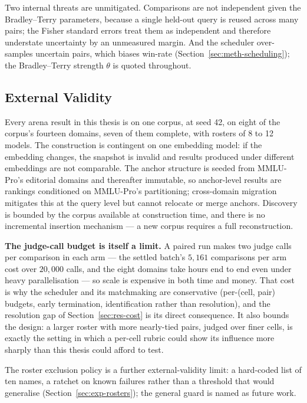 Two internal threats are unmitigated. Comparisons are not independent
given the Bradley--Terry parameters, because a single held-out query is
reused across many pairs; the Fisher standard errors treat them as
independent and therefore understate uncertainty by an unmeasured
margin. And the scheduler over-samples uncertain pairs, which biases
win-rate (Section~\ref{sec:meth-scheduling}); the Bradley--Terry
strength $\theta$ is quoted throughout.

\subsection{External Validity}\label{subsec:disc-external-validity}

Every arena result in this thesis is on one corpus, at seed 42, on
eight of the corpus's fourteen domains, seven of them complete, with
rosters of 8 to 12 models. The construction is
contingent on one embedding model: if the embedding changes, the
snapshot is invalid and results produced under different embeddings are
not comparable. The anchor structure is seeded from MMLU-Pro's
editorial domains and thereafter immutable, so anchor-level results are
rankings conditioned on MMLU-Pro's partitioning; cross-domain migration
mitigates this at the query level but cannot relocate or merge anchors.
Discovery is bounded by the corpus available at construction time,
and there is no incremental insertion mechanism --- a new corpus
requires a full reconstruction.

\textbf{The judge-call budget is itself a limit.} A paired run makes
two judge calls per comparison in each arm --- the settled batch's
$5{,}161$ comparisons per arm cost over $20{,}000$ calls, and the
eight domains take hours end to end even under heavy parallelisation
--- so scale is expensive in both time and money. That cost is why the
scheduler and its matchmaking are conservative (per-(cell, pair)
budgets, early termination, identification rather than resolution),
and the resolution gap of Section~\ref{sec:res-cost} is its direct
consequence. It also bounds the design: a larger roster with more
nearly-tied pairs, judged over finer cells, is exactly the setting in
which a per-cell rubric could show its influence more sharply than
this thesis could afford to test.

The roster exclusion policy is a further external-validity limit: a
hard-coded list of ten names, a ratchet on known failures rather than
a threshold that would generalise
(Section~\ref{sec:exp-rosters}); the general guard is named as future
work.

